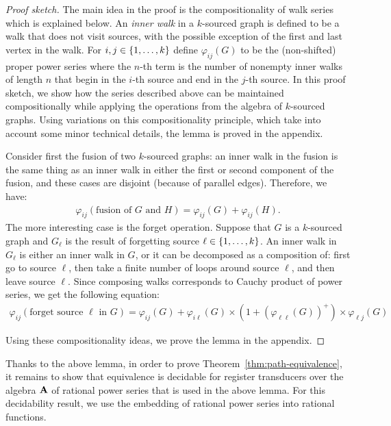 \begin{proof}[Proof sketch] The main idea in the proof is the compositionality of walk series which is explained below. 
    An \emph{inner walk} in a $k$-sourced graph is defined to be a walk that does not visit sources, with the possible exception of the first and last vertex in the walk.  For $i,j \in \{1,\ldots,k\}$ define  $\varphi_{ij}(G)$ to be the (non-shifted) proper power series where the $n$-th term is the number of nonempty inner walks of length $n$ that begin in the $i$-th source and end in the $j$-th source. In this proof sketch, we show how the series described above can be maintained compositionally
      while applying the operations from the algebra of $k$-sourced graphs. Using variations on this compositionality principle, which take into account some minor technical details, the lemma is proved in the appendix. 
    
      Consider first the fusion of two $k$-sourced graphs: an inner walk in the fusion is the same thing as an inner walk in either the first or second component of the fusion, and these cases are disjoint (because of parallel edges). Therefore, we have:
    \begin{align*}
    \varphi_{ij}(\text{fusion of $G$ and $H$}) =  \varphi_{ij}(G) + \varphi_{ij}(H).
    \end{align*}
    The more interesting case is the forget operation. Suppose that $G$ is a $k$-sourced graph and $G_\ell$ is the result of forgetting source $\ell \in \{1,\ldots,k\}$. An inner walk in $G_\ell$ is either an inner walk in $G$, or it can be decomposed as a composition of: first go to source $\ell$, then take a finite number of loops around source $\ell$, and then leave source $\ell$. Since composing walks corresponds to Cauchy product of power series, we get the  following equation:
    \begin{align*}
    \varphi_{ij}(\text{forget source $\ell$ in $G$}) = \varphi_{ij}(G) + \varphi_{i\ell}(G) \times (1 + (\varphi_{\ell \ell}(G))^+) \times \varphi_{\ell j}(G)
    \end{align*}
    
Using these compositionality ideas, we prove the lemma in the appendix.\end{proof}

Thanks to the above lemma, in order to prove Theorem~\ref{thm:path-equivalence}, it remains to show that equivalence is decidable for register transducers over the algebra $\mathbf{A}$ of rational power series that is used in the above lemma.  For this decidability result, we use the embedding of rational power series into rational functions. 

